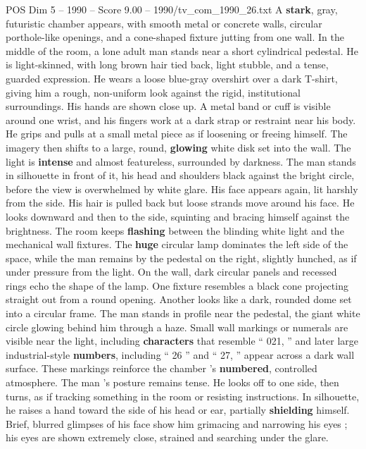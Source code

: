 \begin{textsample}{POS Dim 5 – 1990 – Score 9.00 – 1990/tv\_com\_1990\_26.txt}  \label{ex:f5_pos_012}
A \textbf{stark}, gray, futuristic chamber appears, with smooth metal or concrete walls, circular porthole-like openings, and a cone-shaped fixture jutting from one wall.
In the middle of the room, a lone adult man stands near a short cylindrical pedestal.
He is light-skinned, with long brown hair tied back, light stubble, and a tense, guarded expression.
He wears a loose blue-gray overshirt over a dark T-shirt, giving him a rough, non-uniform look against the rigid, institutional surroundings.
His hands are shown close up.
A metal band or cuff is visible around one wrist, and his fingers work at a dark strap or restraint near his body.
He grips and pulls at a small metal piece as if loosening or freeing himself.
The imagery then shifts to a large, round, \textbf{glowing} white disk set into the wall.
The light is \textbf{intense} and almost featureless, surrounded by darkness.
The man stands in silhouette in front of it, his head and shoulders black against the bright circle, before the view is overwhelmed by white glare.
His face appears again, lit harshly from the side.
His hair is pulled back but loose strands move around his face.
He looks downward and then to the side, squinting and bracing himself against the brightness.
The room keeps \textbf{flashing} between the blinding white light and the mechanical wall fixtures.
The \textbf{huge} circular lamp dominates the left side of the space, while the man remains by the pedestal on the right, slightly hunched, as if under pressure from the light.
On the wall, dark circular panels and recessed rings echo the shape of the lamp.
One fixture resembles a black cone projecting straight out from a round opening.
Another looks like a dark, rounded dome set into a circular frame.
The man stands in profile near the pedestal, the giant white circle glowing behind him through a haze.
Small wall markings or numerals are visible near the light, including \textbf{characters} that resemble “ 021, ” and later large industrial-style \textbf{numbers}, including “ 26 ” and “ 27, ” appear across a dark wall surface.
These markings reinforce the chamber ’s \textbf{numbered}, controlled atmosphere.
The man ’s posture remains tense.
He looks off to one side, then turns, as if tracking something in the room or resisting instructions.
In silhouette, he raises a hand toward the side of his head or ear, partially \textbf{shielding} himself.
Brief, blurred glimpses of his face show him grimacing and narrowing his eyes ; his eyes are shown extremely close, strained and searching under the glare.

\end{textsample}
